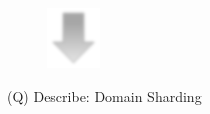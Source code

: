 \documentclass[12pt]{article}
\begin{document}
\begin{figure}[H]
\includegraphics[width=0.5\linewidth]{page79-image-4.png}
\end{figure}
\clearpage
(Q)
Describe: Domain Sharding
\clearpage
\end{document}

